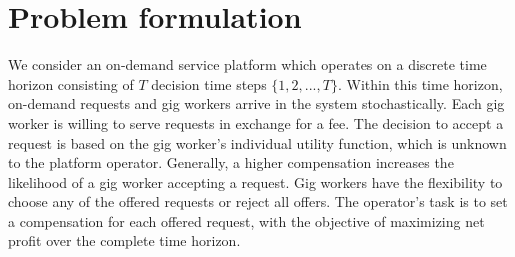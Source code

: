 \section{Problem formulation}
\label{sec:prob_form}
We consider an on-demand service platform which operates on a discrete time horizon consisting of $T$ decision time steps $\{1,2,...,T\}$. Within this time horizon, on-demand requests and gig workers arrive in the system stochastically. Each gig worker is willing to serve requests in exchange for a fee. The decision to accept a request is based on the gig worker's individual utility function, which is unknown to the platform operator. Generally, a higher compensation increases the likelihood of a gig worker accepting a request. Gig workers have the flexibility to choose any of the offered requests or reject all offers. The operator’s task is to set a compensation for each offered request, with the objective of maximizing net profit over the complete time horizon.

